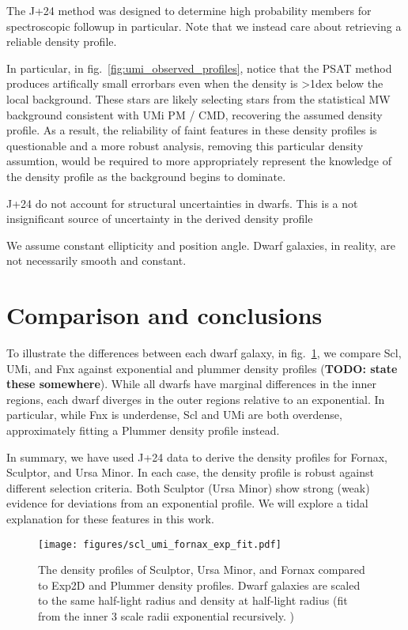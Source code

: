 The J+24 method was designed to determine high probability members for
spectroscopic followup in particular. Note that we instead care about
retrieving a reliable density profile.

In particular, in fig.~\ref{fig:umi_observed_profiles}, notice that the
PSAT method produces artifically small errorbars even when the density
is \textgreater1dex below the local background. These stars are likely
selecting stars from the statistical MW background consistent with UMi
PM / CMD, recovering the assumed density profile. As a result, the
reliability of faint features in these density profiles is questionable
and a more robust analysis, removing this particular density assumtion,
would be required to more appropriately represent the knowledge of the
density profile as the background begins to dominate.

J+24 do not account for structural uncertainties in dwarfs. This is a
not insignificant source of uncertainty in the derived density profile

We assume constant ellipticity and position angle. Dwarf galaxies, in
reality, are not necessarily smooth and constant.

\section{Comparison and conclusions}\label{comparison-and-conclusions}

To illustrate the differences between each dwarf galaxy, in
fig.~\ref{fig:classical_dwarfs_densities}, we compare Scl, UMi, and Fnx
against exponential and plummer density profiles (\textbf{TODO: state
these somewhere}). While all dwarfs have marginal differences in the
inner regions, each dwarf diverges in the outer regions relative to an
exponential. In particular, while Fnx is underdense, Scl and UMi are
both overdense, approximately fitting a Plummer density profile instead.

In summary, we have used J+24 data to derive the density profiles for
Fornax, Sculptor, and Ursa Minor. In each case, the density profile is
robust against different selection criteria. Both Sculptor (Ursa Minor)
show strong (weak) evidence for deviations from an exponential profile.
We will explore a tidal explanation for these features in this work.

\begin{figure}
\centering
\texttt{[image: figures/scl\_umi\_fornax\_exp\_fit.pdf]}
\caption[Classical dwarf density profiles]{The density profiles of
Sculptor, Ursa Minor, and Fornax compared to Exp2D and Plummer density
profiles. Dwarf galaxies are scaled to the same half-light radius and
density at half-light radius (fit from the inner 3 scale radii
exponential recursively. )}\label{fig:classical_dwarfs_densities}
\end{figure}

